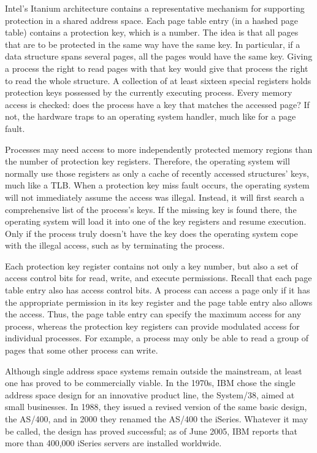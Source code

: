Intel's Itanium architecture contains a representative mechanism for
supporting protection in a shared address space.  Each page table
entry (in a hashed page table) contains a protection key, which is
a number.  The idea is that all pages that are to be protected
in the same way have the same key.  In particular, if a data structure
spans several pages, all the pages would have the same key.
Giving a process the right to read pages with that key would give
that process the right to read the whole structure.  A collection of at least
sixteen special registers holds protection keys possessed by the currently
executing process.  Every memory access is checked: does the process
have a key that matches the accessed page?  If not, the hardware traps
to an operating system handler, much like for a page fault.

Processes may need access to more independently protected memory
regions than the number of protection key registers.  Therefore, the
operating system will normally use those registers as only a cache of
recently accessed structures' keys, much like a TLB.  When a
protection key miss fault occurs, the operating system will not
immediately assume the access was illegal.  Instead, it will first
search a comprehensive list of the process's keys.  If the missing key
is found there, the operating system will load it into one of the key
registers and resume execution.  Only if the process truly doesn't
have the key does the operating system cope with the illegal access,
such as by terminating the process.

Each protection key register contains not only a key number, but also
a set of access control bits for read, write, and execute permissions.  Recall
that each page table entry also has access control bits.  A process
can access a page only if it has the appropriate permission in its key
register and the page table entry also allows the access.  Thus, the
page table entry can specify the maximum access for any process,
whereas the protection key registers can provide modulated access for
individual processes.  For example, a process may only be able to read
a group of pages that some other process can write.

Although single address space systems remain outside the mainstream,
at least one has proved to be commercially viable.  In the 1970s, IBM
chose the single address space design for an innovative product line, the System/38,
aimed at small businesses.  In 1988,
they issued a revised version of the same basic design, the
AS/400, and in 2000 they renamed the AS/400 the
iSeries.  Whatever it may be called, the design has
proved successful; as of June 2005, IBM reports that more than 
400,000 iSeries servers are installed worldwide.

